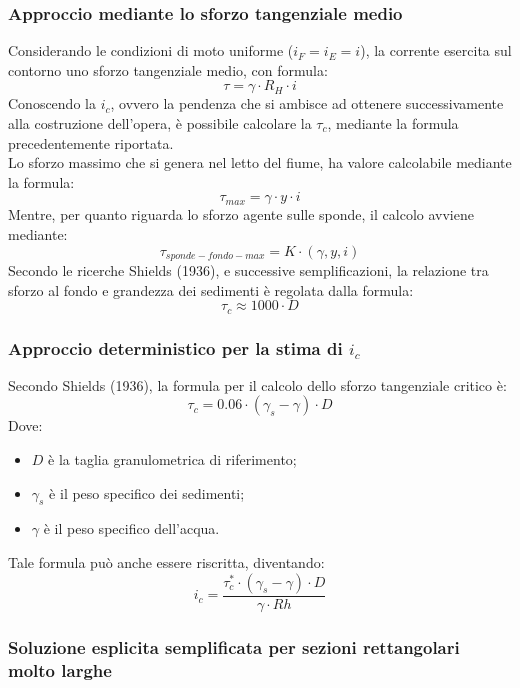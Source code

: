 \subsubsection{Approccio mediante lo sforzo tangenziale medio}
Considerando le condizioni di moto uniforme ($i_F=i_E=i$), la corrente esercita sul contorno uno sforzo tangenziale medio, con formula:
\begin{equation}
    \tau = \gamma \cdot R_H \cdot i
\end{equation}
Conoscendo la $i_c$, ovvero la pendenza che si ambisce ad ottenere successivamente alla costruzione dell'opera, è possibile calcolare la $\tau_{c}$, mediante la formula precedentemente riportata.\\
Lo sforzo massimo che si genera nel letto del fiume, ha valore calcolabile mediante la formula:
\begin{equation}
    \tau_{max} = \gamma \cdot y \cdot i
\end{equation}
Mentre, per quanto riguarda lo sforzo agente sulle sponde, il calcolo avviene mediante:
\begin{equation}
    \tau_{sponde-fondo-max}= K \cdot (\gamma, y, i)
\end{equation}
Secondo le ricerche Shields (1936), e successive semplificazioni, la relazione tra sforzo al fondo e grandezza dei sedimenti è regolata dalla formula:
\begin{equation}
    \tau_c \approx 1000 \cdot D
\end{equation}
\subsubsection{Approccio deterministico per la stima di $i_c$}
Secondo Shields (1936), la formula per il calcolo dello sforzo tangenziale critico è:
\begin{equation}
    \tau_c = 0.06 \cdot (\gamma_s -\gamma) \cdot D
\end{equation}
Dove:
\begin{itemize}
   \item $D$ è la taglia granulometrica di riferimento;
    \item $\gamma_s$ è il peso specifico dei sedimenti;
    \item $\gamma$ è il peso specifico dell'acqua.
\end{itemize}
Tale formula può anche essere riscritta, diventando:
\begin{equation}
    i_c = \frac{\tau_c^* \cdot (\gamma_s-\gamma) \cdot D}{\gamma \cdot Rh}
\end{equation}

\subsubsection{Soluzione esplicita semplificata per sezioni rettangolari molto larghe}
